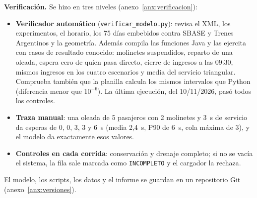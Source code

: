 \textbf{Verificación.} Se hizo en tres niveles (anexo~\ref{anx:verificacion}):
\begin{itemize}
  \item \textbf{Verificador automático} (\texttt{verificar\_modelo.py}): revisa el XML, los experimentos, el
        horario, los 75 días embebidos contra SBASE y Trenes Argentinos y la geometría. Además compila las funciones
        Java y las ejercita con casos de resultado conocido: molinetes suspendidos, reparto de una oleada, espera
        cero de quien pasa directo, cierre de ingresos a las 09:30, mismos ingresos en los cuatro escenarios y
        media del servicio triangular. Comprueba también que la planilla calcula los mismos intervalos que Python
        (diferencia menor que $10^{-6}$). La última ejecución, del 10/11/2026, pasó todos los controles.
  \item \textbf{Traza manual}: una oleada de 5 pasajeros con 2 molinetes y 3~s de servicio da esperas de 0, 0,
        3, 3 y 6~s (media 2,4~s, P90 de 6~s, cola máxima de 3), y el modelo da exactamente esos valores.
  \item \textbf{Controles en cada corrida}: conservación y drenaje completo; si no se vacía el sistema, la fila
        sale marcada como \texttt{INCOMPLETO} y el cargador la rechaza.
\end{itemize}
El modelo, los scripts, los datos y el informe se guardan en un repositorio Git (anexo~\ref{anx:versiones}).
